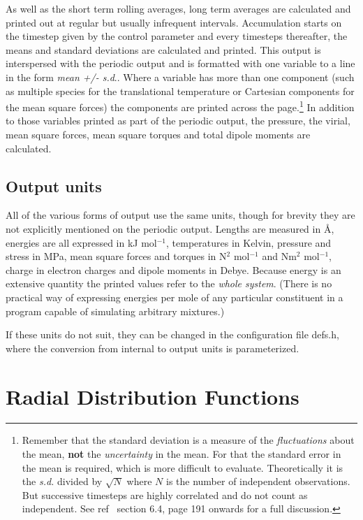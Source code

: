 \documentclass[a4paper,twoside]{report}
\newcommand{\Emph}[1]{\textbf{#1}}
\newcommand{\Fname}[1]{{\upshape\mdseries\sffamily#1}}
\begin{document}
As well as the short term rolling averages, long term averages are
calculated and printed out at regular but usually infrequent
intervals.  Accumulation starts on the timestep given by the control
parameter  and every 
timesteps thereafter, the means and standard deviations are calculated
and printed.  This output is interspersed with the periodic output and
is formatted with one variable to a line in the form \emph{mean +/-
  s.d}.. Where a variable has more than one component (such as
multiple species for the translational temperature or Cartesian
components for the mean square forces) the components are printed
across the page.\footnote{Remember that the standard deviation is a
  measure of the \emph{fluctuations} about the mean, \Emph{not} the
  \emph{uncertainty} in the mean. For that the standard error in the
  mean is required, which is more difficult to evaluate.
  Theoretically it is the \emph{s.d.} divided by $\sqrt N$ where $N$
  is the number of independent observations.  But successive timesteps
  are highly correlated and do not count as independent.  See
  ref~\cite{allen:87} section 6.4, page 191 onwards for a full
  discussion.}  In addition to those variables printed as part of the
periodic output, the pressure, the virial, mean square forces, mean
square torques and total dipole moments are calculated.

\subsection{Output units}
All of the various forms of output use the same units, though for
brevity they are not explicitly mentioned on the periodic output.
Lengths are measured in \AA, energies are all expressed in kJ
mol$^{-1}$, temperatures in Kelvin, pressure and stress in MPa, mean
square forces and torques in N$^2$ mol$^{-1}$ and Nm$^2$
mol$^{-1}$, charge in electron charges and dipole moments in Debye.
Because energy is an extensive quantity the printed values refer to
the \emph{whole system}.  (There is no practical way of expressing
energies per mole of any particular constituent in a program capable
of simulating arbitrary mixtures.)

If these units do not suit, they can be changed in the configuration
file \Fname{defs.h}, where the conversion from internal to output units
is parameterized.
\section{Radial Distribution Functions}%
\end{document}

